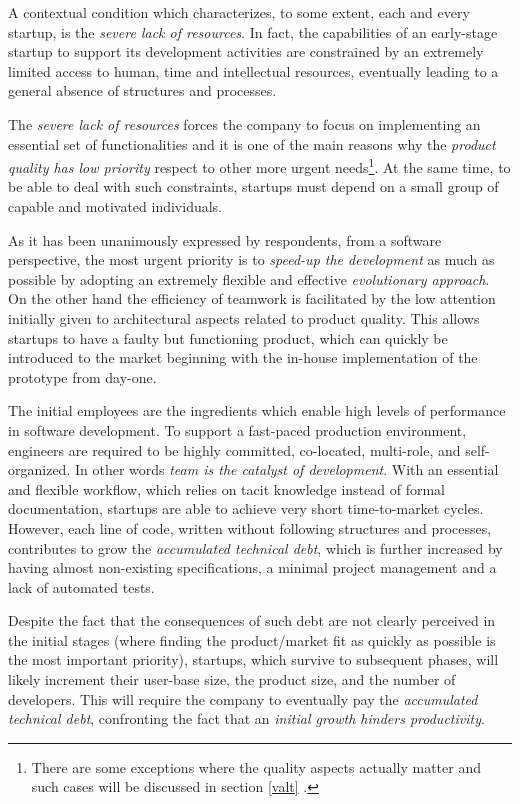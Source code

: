 \documentclass[10pt,journal,letterpaper,compsoc]{IEEEtran}
\begin{document}
A contextual condition which characterizes, to some extent, each and every 
startup, is the \textit{severe lack of resources}. In fact, the capabilities of 
an early-stage startup to support its development activities are constrained by 
an extremely limited access to human, time and intellectual resources, 
eventually leading to a general absence of structures and processes.

The \textit{severe lack of resources} forces the company to focus on 
implementing an essential set of functionalities and it is one of the main 
reasons why the \textit{product quality has low priority} respect to other more 
urgent needs\footnote{There are some exceptions where the quality aspects 
actually matter and such cases will be discussed in section \ref{valt}%
.}. At the same time, to be able to deal with such constraints, startups must 
depend on a small group of capable and motivated individuals.

As it has been unanimously expressed by respondents, from a software 
perspective, the most urgent priority is to \textit{speed-up the development} as 
much as possible by adopting an extremely flexible and effective 
\textit{evolutionary approach}. On the other hand the efficiency of teamwork is 
facilitated by the low attention initially given to architectural aspects 
related to product quality. This allows startups to have a faulty but 
functioning product, which can quickly be introduced to the market beginning 
with the in-house implementation of the prototype from day-one.

The initial employees are the ingredients which enable high levels of 
performance in software development. To support a fast-paced production 
environment, engineers are required to be highly committed, co-located, 
multi-role, and self-organized. In other words \textit{team is the catalyst of 
development}.
With an essential and flexible workflow, which relies on tacit knowledge 
instead of formal documentation, startups are able to achieve very short 
time-to-market cycles. However, each line of code, written without following 
structures and processes, contributes to grow the \textit{accumulated technical 
debt}, which is further increased by having almost non-existing specifications, 
a minimal project management and a lack of automated tests.

Despite the fact that the consequences of such debt are not clearly perceived 
in the initial stages (where finding the product/market fit as quickly as 
possible is the most important priority), startups, which survive to subsequent 
phases, will likely increment their user-base size, the product size, and the 
number of developers. This will require the company to eventually pay the 
\textit{accumulated technical debt}, confronting the fact that an 
\textit{initial growth hinders productivity}.
\end{document}
